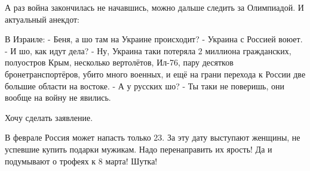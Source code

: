 А раз война закончилась не начавшись, можно дальше следить за Олимпиадой. И актуальный анекдот:

\begin{zznagolos}
\obeycr
В Израиле:
- Беня, а шо там на Украине происходит?
- Украина с Россией воюет.
- И шо, как идут дела?
- Ну, Украина таки потеряла 2 миллиона гражданских, полуостров Крым, несколько вертолётов, Ил-76, пару десятков бронетранспортёров, убито много военных, и ещё на грани перехода к России две большие области на востоке.
- А у русских шо?
- Ты таки не поверишь, они вообще на войну не явились.	
\restorecr
\end{zznagolos}

Хочу сделать заявление.

В феврале Россия может напасть только 23. За эту дату выступают женщины, не
успевшие купить подарки мужикам. Надо перенаправить их ярость! Да и подумывают
о трофеях к 8 марта! Шутка!
